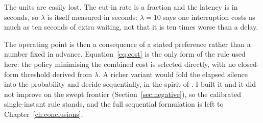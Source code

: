 The units are easily lost. The cut-in rate is a fraction and the latency is in seconds, so
$\lambda$ is itself measured in seconds: $\lambda = 10$ says one interruption costs as much
as ten seconds of extra waiting, not that it is ten times worse than a delay. 

The operating point is then a consequence of a stated preference rather than a number fixed in advance.
Equation~\ref{eq:cost} is the only form of the rule used here: the policy minimising the
combined cost is selected directly, with no closed-form threshold derived from $\lambda$. A richer variant would fold the elapsed silence into the probability and
decide sequentially, in the spirit of \citet{wald1945sequential}. I built it and it did not
improve on the swept frontier (Section~\ref{sec:negative}), so the calibrated single-instant rule stands, and the full sequential formulation is left to Chapter~\ref{ch:conclusions}.
